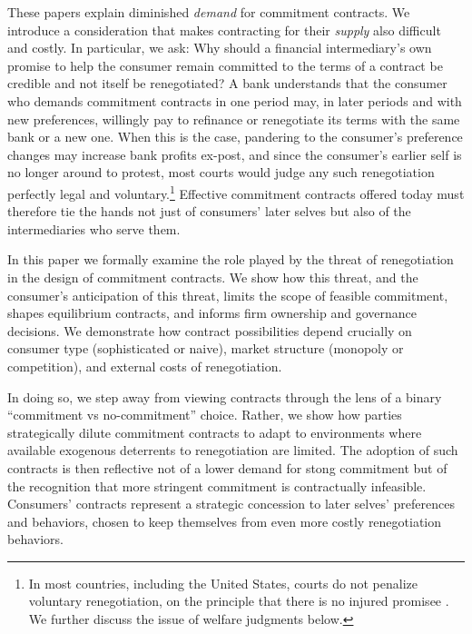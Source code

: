 \documentclass[11pt,english]{article}
\theoremstyle{plain}
\theoremstyle{definition}
\begin{document}
These papers explain diminished \textit{demand} for commitment contracts. We introduce a consideration that makes contracting for their \textit{supply} also difficult and costly. In particular, we ask: Why should a financial intermediary's own promise to help the consumer remain committed to the terms of a contract be credible and not itself be renegotiated? A bank understands that the consumer who demands commitment contracts in one period may, in later periods and with new preferences, willingly pay to refinance or renegotiate its terms \textendash{} with the same bank or a new one. When this is the case, pandering to the consumer's preference changes may increase bank profits ex-post, and since the consumer's earlier self is no longer around to protest, most courts would judge any such renegotiation perfectly legal and voluntary.\footnote{In most countries, including the United States, courts do not penalize voluntary renegotiation, on the principle that there is no injured promisee \citep[see discussion in][p448]{laibson1997}. We further discuss the issue of welfare judgments below.} Effective commitment contracts offered today must therefore tie the hands not just of consumers' later selves but also of the intermediaries who serve them.

In this paper we formally examine the role played by the threat of renegotiation in the design of commitment contracts. We show how this threat, and the consumer's anticipation of this threat, limits the scope of feasible commitment, shapes equilibrium contracts, and informs firm ownership and governance decisions. We demonstrate how contract possibilities depend crucially on consumer type (sophisticated or naive), market structure (monopoly or competition), and external costs of renegotiation.

In doing so, we step away from viewing contracts through the lens of a binary ``commitment vs no-commitment'' choice. Rather, we show how parties strategically dilute commitment contracts to adapt to environments where available exogenous deterrents to renegotiation are limited. The adoption of such contracts is then reflective not of a lower demand for stong commitment but of the recognition that more stringent commitment is contractually infeasible.
Consumers' contracts represent a strategic concession to later selves' preferences and behaviors, chosen to keep themselves from even more costly renegotiation behaviors.  
\end{document}
